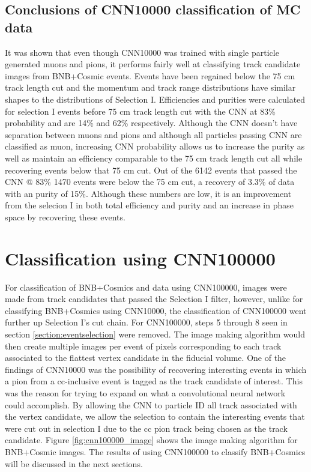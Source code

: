 \subsection{Conclusions of CNN10000 classification of MC data}

It was shown that even though CNN10000 was trained with single particle generated muons and pions, it performs fairly well at classifying track candidate images from BNB+Cosmic events. Events have been regained below the 75 cm track length cut and the momentum and track range distributions have similar shapes to the distributions of Selection I. Efficiencies and purities were calculated for selection I events before 75 cm track length cut  with the CNN at 83\% probability and are 14\% and 62\% respectively. Although the CNN doesn't have separation between muons and pions and although all particles passing CNN are classified as muon, increasing CNN probability allows us to increase the purity as well as maintain an efficiency comparable to the 75 cm track length cut all while recovering events below that 75 cm cut. Out of the 6142 events that passed the CNN @ 83\% 1470 events were below the 75 cm cut, a recovery of 3.3\% of data with an purity of 15\%. Although these numbers are low, it is an improvement from the selecion I in both total efficiency and purity and an increase in phase space by recovering these events. 

\section{Classification using CNN100000}
For classification of BNB+Cosmics and data using CNN100000, images were made from track candidates that passed the Selection I filter, however, unlike for classifying BNB+Cosmics using CNN10000, the classification of CNN100000 went further up Selection I's cut chain. For CNN100000, steps 5 through 8 seen in section \ref{section:eventselection} were removed. The image making algorithm would then create multiple images per event of pixels corresponding to each track associated to the flattest vertex candidate in the fiducial volume. One of the findings of CNN10000 was the possibility of recovering interesting events in which a pion from a cc-inclusive event is tagged as the track candidate of interest. This was the reason for trying to expand on what a convolutional neural network could accomplish. By allowing the CNN to particle ID all track associated with the vertex candidate, we allow the selection to contain the interesting events that were cut out in selection I due to the cc pion track being chosen as the track candidate. Figure \ref{fig:cnn100000_image} shows the image making algorithm for BNB+Cosmic images. The results of using CNN100000 to classify BNB+Cosmics will be discussed in the next sections. 

